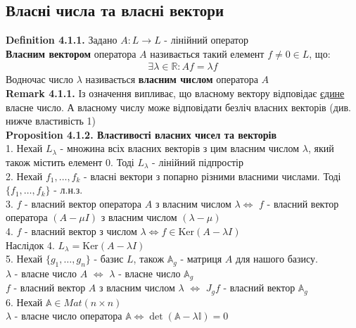 \documentclass[a4paper, 14pt]{extarticle}
\def\defin#1{\textbf{Definition {#1}}}
\def\rm#1{\textbf{Remark {#1}}}
\def\prp#1{\textbf{Proposition {#1}}}
\def\bigline{\vspace{5mm}\\}
\begin{document}
\subsection{Власні числа та власні вектори}
\defin{4.1.1.} Задано $A: L \to L$ - лінійний оператор\\
\textbf{Власним вектором} оператора $A$ називається такий елемент $f \neq 0 \in L$, що:
\begin{align*}
\exists \lambda \in \mathbb{R}: Af = \lambda f
\end{align*}
Водночас число $\lambda$ називається \textbf{власним числом} оператора $A$ \bigline
\rm{4.1.1.} Із означення випливає, що власному вектору відповідає \underline{єдине} власне число. А власному числу може відповідати безліч власних векторів (див. нижче властивість 1)
\bigline
\prp{4.1.2. Властивості власних чисел та векторів}\\
1. Нехай $L_{\lambda}$ - множина всіх власних векторів з цим власним числом $\lambda$, який також містить елемент $0$. Тоді $L_{\lambda}$ - лінійний підпростір\\
2. Нехай $f_1,\dots,f_k$ - власні вектори з попарно різними власними числами. Тоді $\{f_1,\dots,f_k\}$ - л.н.з.\\
3. $f$ - власний вектор оператора $A$ з власним числом $\lambda \iff$ $f$ - власний вектор оператора $(A - \mu I)$ з власним числом $(\lambda - \mu)$\\
4. $f$ - власний вектор з числом $\lambda \iff f \in \textrm{Ker}(A-\lambda I)$\\
Наслідок 4. $L_{\lambda} = \textrm{Ker}(A-\lambda I)$\\
5. Нехай $\{g_1,\dots,g_n\}$ - базис $L$, також $\mathbb{A}_g$ - матриця $A$ для нашого базису.\\
$\lambda$ - власне число $A$ $\iff$ $\lambda$ - власне число $\mathbb{A}_g$\\
$f$ - власний вектор $A$ з власним числом $\lambda$ $\iff$ $J_g f$ - власний вектор $\mathbb{A}_g$\\
6. Нехай $\mathbb{A} \in Mat(n \times n)$\\
$\lambda$ - власне число оператора $\mathbb{A} \iff \det (\mathbb{A} - \lambda \mathbb{I}) = 0$\\
\end{document}
